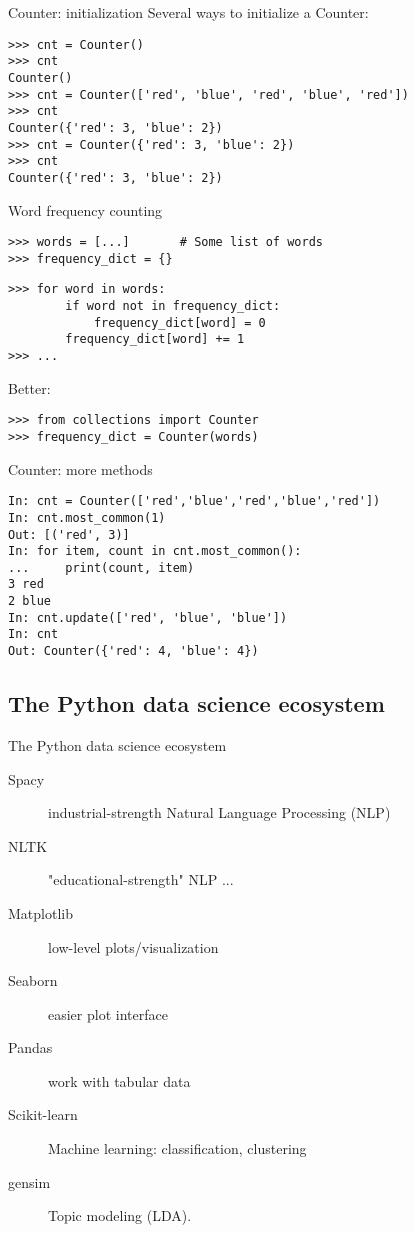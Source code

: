 \documentclass[aspectratio=169,usenames,dvipsnames]{beamer}
\begin{document}
\begin{frame}[fragile]{Counter: initialization}
Several ways to initialize a Counter:\\

\begin{lstlisting}
>>> cnt = Counter()
>>> cnt
Counter()
>>> cnt = Counter(['red', 'blue', 'red', 'blue', 'red'])
>>> cnt
Counter({'red': 3, 'blue': 2})
>>> cnt = Counter({'red': 3, 'blue': 2})
>>> cnt
Counter({'red': 3, 'blue': 2})
\end{lstlisting}
\end{frame}

\begin{frame}[fragile]{Word frequency counting}
\begin{lstlisting}
>>> words = [...]       # Some list of words
>>> frequency_dict = {}
\end{lstlisting}\pause
\begin{lstlisting}
>>> for word in words:
        if word not in frequency_dict:
            frequency_dict[word] = 0
		frequency_dict[word] += 1
>>> ...
\end{lstlisting}
\pause
Better:
\begin{lstlisting}
>>> from collections import Counter
>>> frequency_dict = Counter(words)
\end{lstlisting}
\end{frame}

\begin{frame}[fragile]{Counter: more methods}
\begin{lstlisting}
In: cnt = Counter(['red','blue','red','blue','red'])
In: cnt.most_common(1)
Out: [('red', 3)]
In: for item, count in cnt.most_common():
...     print(count, item)
3 red
2 blue
In: cnt.update(['red', 'blue', 'blue'])
In: cnt
Out: Counter({'red': 4, 'blue': 4})

\end{lstlisting}
\end{frame}


\subsection{The Python data science ecosystem}
\begin{frame}[fragile]{The Python data science ecosystem}
    \begin{description}
        \item[Spacy] industrial-strength Natural Language Processing (NLP)
        \item[NLTK] "educational-strength" NLP ...
        \item[Matplotlib] low-level plots/visualization
        \item[Seaborn] easier plot interface
        \item[Pandas] work with tabular data
        \item[Scikit-learn] Machine learning: classification, clustering
        \item[gensim] Topic modeling (LDA).
    \end{description}

	
\end{frame}
\end{document}
